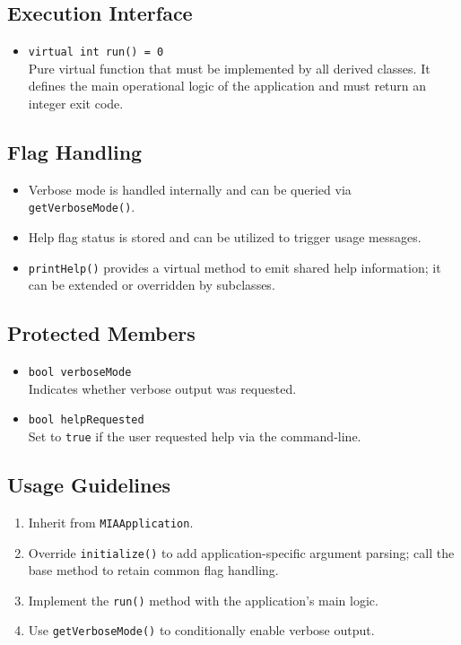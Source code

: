 \subsection*{Execution Interface}
\begin{itemize}
	\item \texttt{virtual int run() = 0} \\
	Pure virtual function that must be implemented by all derived classes. It defines the main operational logic of the application and must return an integer exit code.
\end{itemize}

\subsection*{Flag Handling}
\begin{itemize}
	\item Verbose mode is handled internally and can be queried via \texttt{getVerboseMode()}.
	\item Help flag status is stored and can be utilized to trigger usage messages.
	\item \texttt{printHelp()} provides a virtual method to emit shared help information; it can be extended or overridden by subclasses.
\end{itemize}

\subsection*{Protected Members}
\begin{itemize}
	\item \texttt{bool verboseMode} \\
	Indicates whether verbose output was requested.
	\item \texttt{bool helpRequested} \\
	Set to \texttt{true} if the user requested help via the command-line.
\end{itemize}

\subsection*{Usage Guidelines}
\begin{enumerate}
	\item Inherit from \texttt{MIAApplication}.
	\item Override \texttt{initialize()} to add application-specific argument parsing; call the base method to retain common flag handling.
	\item Implement the \texttt{run()} method with the application's main logic.
	\item Use \texttt{getVerboseMode()} to conditionally enable verbose output.
\end{enumerate}

